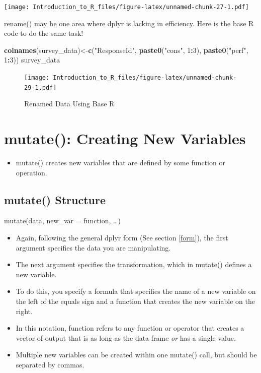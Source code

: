 \documentclass[]{book}
\newenvironment{Shaded}{\begin{snugshade}}{\end{snugshade}}
\newcommand{\DecValTok}[1]{\textcolor[rgb]{0.00,0.00,0.81}{#1}}
\newcommand{\KeywordTok}[1]{\textcolor[rgb]{0.13,0.29,0.53}{\textbf{#1}}}
\newcommand{\NormalTok}[1]{#1}
\newcommand{\OperatorTok}[1]{\textcolor[rgb]{0.81,0.36,0.00}{\textbf{#1}}}
\newcommand{\StringTok}[1]{\textcolor[rgb]{0.31,0.60,0.02}{#1}}
\providecommand{\tightlist}{%
  \setlength{\itemsep}{0pt}\setlength{\parskip}{0pt}}
\theoremstyle{definition}
\theoremstyle{definition}
\theoremstyle{definition}
\theoremstyle{remark}
\let\BeginKnitrBlock\begin \let\EndKnitrBlock\end
\begin{document}
\texttt{[image: Introduction\_to\_R\_files/figure-latex/unnamed-chunk-27-1.pdf]}

\BeginKnitrBlock{example}
\protect\hypertarget{exm:rename3}{}{\label{exm:rename3} }rename() may be one area where dplyr is lacking in efficiency. Here is the base R code to do the same task!
\EndKnitrBlock{example}

\begin{Shaded}
\begin{Highlighting}[]
\KeywordTok{colnames}\NormalTok{(survey_data)<-}\KeywordTok{c}\NormalTok{(}\StringTok{"ResponseId"}\NormalTok{, }\KeywordTok{paste0}\NormalTok{(}\StringTok{"cons"}\NormalTok{, }\DecValTok{1}\OperatorTok{:}\DecValTok{3}\NormalTok{), }\KeywordTok{paste0}\NormalTok{(}\StringTok{"perf"}\NormalTok{, }\DecValTok{1}\OperatorTok{:}\DecValTok{3}\NormalTok{))}
\NormalTok{survey_data}
\end{Highlighting}
\end{Shaded}

\begin{figure}
\centering
\texttt{[image: Introduction\_to\_R\_files/figure-latex/unnamed-chunk-29-1.pdf]}
\caption{\label{fig:unnamed-chunk-29}Renamed Data Using Base R}
\end{figure}

\hypertarget{mutate-creating-new-variables}{%
\section{mutate(): Creating New Variables}\label{mutate-creating-new-variables}}

\begin{itemize}
\tightlist
\item
  mutate() creates new variables that are defined by some function or operation.
\end{itemize}

\hypertarget{mutate-structure}{%
\subsection{mutate() Structure}\label{mutate-structure}}

mutate(data, new\_var = function, \ldots{})

\begin{itemize}
\tightlist
\item
  Again, following the general dplyr form (See section \ref{form}), the first argument specifies the data you are manipulating.
\item
  The next argument specifies the transformation, which in mutate() defines a new variable.
\item
  To do this, you specify a formula that specifies the name of a new variable on the left of the equals sign and a function that creates the new variable on the right.
\item
  In this notation, function refers to any function or operator that creates a vector of output that is as long as the data frame \emph{or} has a single value.
\item
  Multiple new variables can be created within one mutate() call, but should be separated by commas.
\end{itemize}
\end{document}
